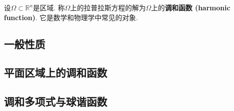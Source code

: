 

设$\Omega\subset\mathbb{R}^n$是区域. 称$\Omega$上的拉普拉斯方程的解为$\Omega$上的\textbf{调和函数 (harmonic function)}. 它是数学和物理学中常见的对象.

\subsection{一般性质}

\subsection{平面区域上的调和函数}


\subsection{调和多项式与球谐函数}
